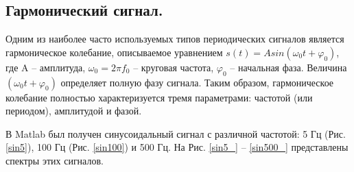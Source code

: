 \documentclass[a4paper,14pt]{extarticle}
\begin{document}
\subsection{Гармонический сигнал.}
Одним из наиболее часто используемых типов периодических сигналов является гармоническое колебание, описываемое уравнением $s (t) = A sin (\omega_0 t + \varphi_0 )$, где A – амплитуда, $\omega_0 = 2 \pi f_0$ – круговая частота, $\varphi_0$ – начальная фаза. Величина $(\omega_0 t + \varphi_0)$ определяет полную фазу сигнала. Таким образом, гармоническое колебание полностью характеризуется тремя параметрами: частотой (или периодом), амплитудой и фазой.

В Matlab был получен синусоидальный сигнал с различной частотой: 5 Гц (Рис. \ref{sin5}), 100 Гц (Рис. \ref{sin100}) и 500 Гц. На Рис. \ref{sin5_} -- \ref{sin500_} представлены спектры этих сигналов.
\end{document}
